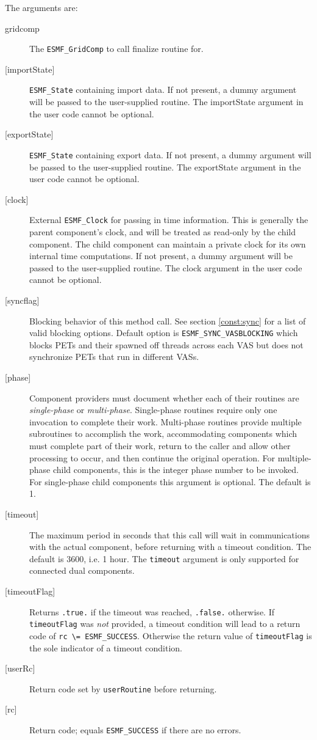    The arguments are:
   \begin{description}
   \item[gridcomp]
     The {\tt ESMF\_GridComp} to call finalize routine for.
   \item[{[importState]}]
     {\tt ESMF\_State} containing import data. If not present, a dummy
     argument will be passed to the user-supplied routine.  The
     importState argument in the user code cannot be optional.
   \item[{[exportState]}]
     {\tt ESMF\_State} containing export data. If not present, a dummy
     argument will be passed to the user-supplied routine.  The
     exportState argument in the user code cannot be optional.
   \item[{[clock]}]
     External {\tt ESMF\_Clock} for passing in time information.
     This is generally the parent component's clock, and will be treated
     as read-only by the child component.  The child component can maintain
     a private clock for its own internal time computations. If not present, a dummy
     argument will be passed to the user-supplied routine.  The
     clock argument in the user code cannot be optional.
   \item[{[syncflag]}]
     Blocking behavior of this method call. See section \ref{const:sync}
     for a list of valid blocking options. Default option is
     {\tt ESMF\_SYNC\_VASBLOCKING} which blocks PETs and their spawned off threads
     across each VAS but does not synchronize PETs that run in different VASs.
   \item[{[phase]}]
     Component providers must document whether each of their
     routines are {\em single-phase} or {\em multi-phase}.
     Single-phase routines require only one invocation to complete
     their work.
     Multi-phase routines provide multiple subroutines to accomplish
     the work, accommodating components which must complete part of their
     work, return to the caller and allow other processing to occur,
     and then continue the original operation.
     For multiple-phase child components, this is the integer phase
     number to be invoked.
     For single-phase child components this argument is optional. The default
     is 1.
   \item[{[timeout]}]
     The maximum period in seconds that this call will wait in communications
     with the actual component, before returning with a timeout condition.
     The default is 3600, i.e. 1 hour. The {\tt timeout} argument is only
     supported for connected dual components.
   \item[{[timeoutFlag]}]
     Returns {\tt .true.} if the timeout was reached, {\tt .false.} otherwise.
     If {\tt timeoutFlag} was {\em not} provided, a timeout condition will lead
     to a return code of {\tt rc \textbackslash = ESMF\_SUCCESS}. Otherwise the
     return value of {\tt timeoutFlag} is the sole indicator of a timeout
     condition.
   \item[{[userRc]}]
     Return code set by {\tt userRoutine} before returning.
   \item[{[rc]}]
     Return code; equals {\tt ESMF\_SUCCESS} if there are no errors.
   \end{description}
   
